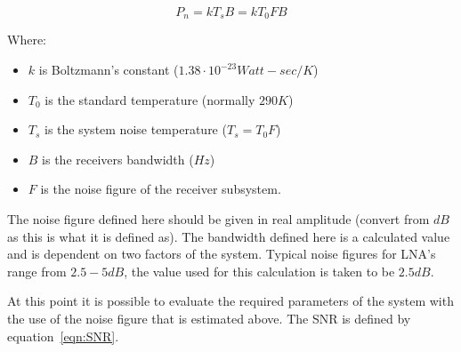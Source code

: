 \documentclass[11pt]{witseiepaper}
\begin{document}
\begin{equation} \label{eqn:ThermalNoise}
P_{n} = k T_{s} B = k T_{0} F B
\end{equation}

Where:
\begin{itemize}
    \item $k$ is Boltzmann's constant ($1.38 \cdot 10^{-23} Watt-sec/K$)
    \item $T_{0}$ is the standard temperature (normally $290 K$)
    \item $T_{s}$ is the system noise temperature ($T_{s} = T_{0} F$)
    \item $B$ is the receivers bandwidth ($Hz$)
    \item $F$ is the noise figure of the receiver subsystem.
\end{itemize}

The noise figure defined here should be given in real amplitude (convert from $dB$ as this is what it is defined as). The bandwidth defined here is a calculated value and is dependent on two factors of the system. Typical noise figures for LNA's range from $2.5 - 5 dB$, the value used for this calculation is taken to be $2.5 dB$.



At this point it is possible to evaluate the required parameters of the system with the use of the noise figure that is estimated above.
The SNR is defined by equation~\ref{eqn:SNR}.
\end{document}
